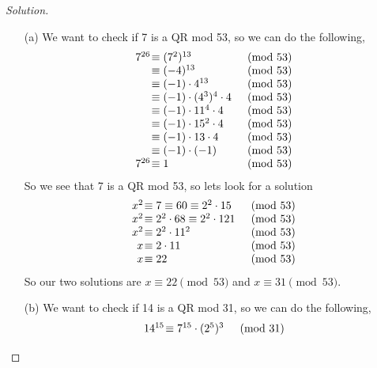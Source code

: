 \documentclass[11pt]{article}
\newenvironment{solution}
  {\renewcommand\qedsymbol{$~$}\begin{proof}[Solution]$ $\par\nobreak\ignorespaces}
  {\end{proof}}
\begin{document}
\begin{solution}
  \begin{itemize}
    \item [(a)] We want to check if 7 is a QR mod 53, so we can do the following,
          \[
            \begin{array}{r @{\hspace{1pt}} l l}
              7^{26} & \equiv (7^2)^{13}                & \pmod{53} \\
                     & \equiv (-4)^{13}                 & \pmod{53} \\
                     & \equiv (-1)\cdot 4^{13}          & \pmod{53} \\
                     & \equiv (-1)\cdot (4^3)^4 \cdot 4 & \pmod{53} \\
                     & \equiv (-1)\cdot 11^4 \cdot 4    & \pmod{53} \\
                     & \equiv (-1)\cdot 15^2 \cdot 4    & \pmod{53} \\
                     & \equiv (-1)\cdot 13 \cdot 4      & \pmod{53} \\
                     & \equiv (-1)\cdot (-1)            & \pmod{53} \\
              7^{26} & \equiv 1                         & \pmod{53}
            \end{array}
          \]
          So we see that 7 is a QR mod 53, so lets look for a solution
          \[\begin{array}{r @{\hspace{1pt}} l l}
              x^2 & \equiv 7 \equiv 60 \equiv 2^2 \cdot 15    & \pmod{53} \\
              x^2 & \equiv 2^2 \cdot 68  \equiv 2^2 \cdot 121 & \pmod{53} \\
              x^2 & \equiv 2^2 \cdot 11^2                     & \pmod{53} \\
              x   & \equiv 2\cdot 11                          & \pmod{53} \\
              x   & \equiv 22                                 & \pmod{53}
            \end{array}\]
          So our two solutions are $x\equiv 22\pmod{53}$ and $x\equiv 31 \pmod{53}$.
    \item [(b)] We want to check if 14 is a QR mod 31, so we can do the following,
          \[
            \begin{array}{r @{\hspace{1pt}} l l}
              14^{15} & \equiv 7^{15} \cdot (2^5)^3  & \pmod{31} \\

\end{array}\]
\end{itemize}
\end{solution}
\end{document}
